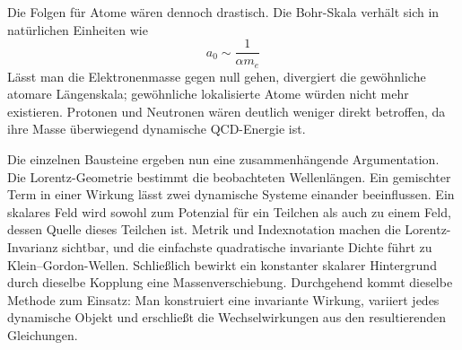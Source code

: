 Die Folgen für Atome wären dennoch drastisch. Die Bohr-Skala verhält sich in natürlichen Einheiten wie
\begin{equation}
a_0\sim\frac{1}{\alpha m_e}
\end{equation}
Lässt man die Elektronenmasse gegen null gehen, divergiert die gewöhnliche atomare Längenskala; gewöhnliche lokalisierte Atome würden nicht mehr existieren. Protonen und Neutronen wären deutlich weniger direkt betroffen, da ihre Masse überwiegend dynamische QCD-Energie ist.

Die einzelnen Bausteine ergeben nun eine zusammenhängende Argumentation. Die Lorentz-Geometrie bestimmt die beobachteten Wellenlängen. Ein gemischter Term in einer Wirkung lässt zwei dynamische Systeme einander beeinflussen. Ein skalares Feld wird sowohl zum Potenzial für ein Teilchen als auch zu einem Feld, dessen Quelle dieses Teilchen ist. Metrik und Indexnotation machen die Lorentz-Invarianz sichtbar, und die einfachste quadratische invariante Dichte führt zu Klein--Gordon-Wellen. Schließlich bewirkt ein konstanter skalarer Hintergrund durch dieselbe Kopplung eine Massenverschiebung. Durchgehend kommt dieselbe Methode zum Einsatz: Man konstruiert eine invariante Wirkung, variiert jedes dynamische Objekt und erschließt die Wechselwirkungen aus den resultierenden Gleichungen.
